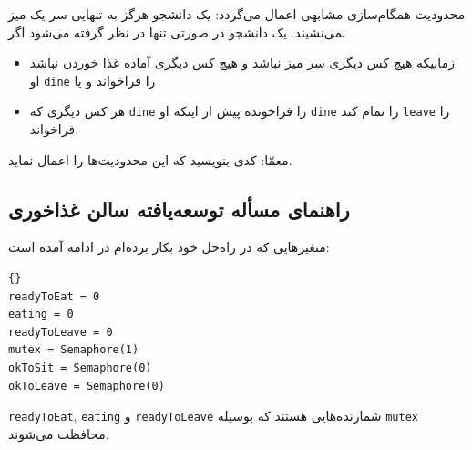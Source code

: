 \documentclass{book}
\newcommand{\clearemptydoublepage}{\newpage\cleardoublepage}
\begin{document}
    محدودیت همگام‌سازی مشابهی اعمال می‌گردد: 
    یک دانشجو هرگز به تنهایی سر یک میز نمی‌نشیند. یک دانشجو در صورتی تنها در نظر گرفته می‌شود اگر 

\begin{itemize}

\item %
    زمانیکه هیچ کس دیگری سر میز نباشد و هیچ کس دیگری آماده غذا خوردن نباشد او {\tt dine} را فراخواند و یا 

\item %
    هر کس دیگری که {\tt dine} را فراخونده پیش از اینکه او {\tt dine} را تمام کند {\tt leave} را فراخواند. 

\end{itemize}

    معمّا: کدی بنویسید که این محدودیت‌ها را اعمال نماید. 


\clearemptydoublepage
\subsection{راهنمای مسأله توسعه‌یافته سالن غذاخوری}

    متغیرهایی که در راه‌حل خود بکار برده‌ام در ادامه آمده است:‌

\begin{latin}
\begin{lstlisting}[title=\rl{راهنمای مسأله توسعه‌یافته سالن غذاخوری}]{}
readyToEat = 0
eating = 0
readyToLeave = 0
mutex = Semaphore(1)
okToSit = Semaphore(0)
okToLeave = Semaphore(0)
\end{lstlisting}
\end{latin}

    {\tt readyToEat}, {\tt eating} و {\tt readyToLeave} 
    شمارنده‌هایی هستند که بوسیله {\tt mutex} محافظت می‌شوند. 
\end{document}
